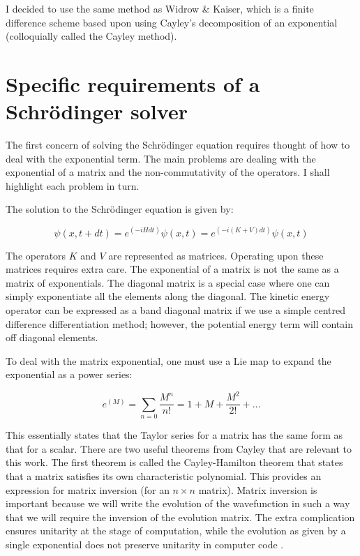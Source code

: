 \noindent I decided to use the same method as Widrow \& Kaiser, which is a finite difference scheme based upon using Cayley's decomposition of an exponential (colloquially called the Cayley method).

\section{Specific requirements of a Schr\"odinger solver}
\label{spec_requirements}
The first concern of solving the Schr\"odinger equation requires thought of how to deal with the exponential term. The main problems are dealing with the exponential of a matrix and the non-commutativity of the operators. I shall highlight each problem in turn.

The solution to the Schr\"odinger equation is given by:

\begin{equation}
 \psi(x, t+dt) = e^{(-iHdt)} \psi(x, t) = e^{(-i(K+V)dt)} \psi(x, t)
\end{equation}

\noindent The operators $K$ and $V$ are represented as matrices. Operating upon these matrices requires extra care. The exponential of a matrix is not the same as a matrix of exponentials. The diagonal matrix is a special case where one can simply exponentiate all the elements along the diagonal. The kinetic energy operator can be expressed as a band diagonal matrix if we use a simple centred difference differentiation method; however, the potential energy term will contain off diagonal elements.

To deal with the matrix exponential, one must use a Lie map to expand the exponential as a power series:

\begin{equation}
 e^{(M)} = \sum_{n = 0} \frac{M^n}{n!} = 1 + M + \frac{M^2}{2!} + \ldots
\end{equation}

\noindent This essentially states that the Taylor series for a matrix has the same form as that for a scalar. There are two useful theorems from Cayley that are relevant to this work. The first theorem is called the Cayley-Hamilton theorem that states that a matrix satisfies its own characteristic polynomial. This provides an expression for matrix inversion (for an $n\times n$ matrix). Matrix inversion is important because we will write the evolution of the wavefunction in such a way that we will require the inversion of the evolution matrix. The extra complication ensures unitarity at the stage of computation, while the evolution as given by a single exponential does not preserve unitarity in computer code \citep{bib_nr}.

